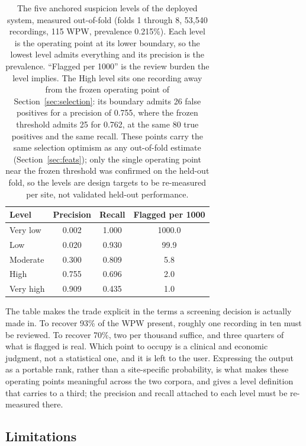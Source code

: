\documentclass[11pt]{article}
\begin{document}
\begin{table}[t]
  \centering
  \small
  \caption{The five anchored suspicion levels of the deployed system, measured out-of-fold (folds 1 through 8, 53{,}540 recordings, 115 WPW, prevalence 0.215\%). Each level is the operating point at its lower boundary, so the lowest level admits everything and its precision is the prevalence. ``Flagged per 1000'' is the review burden the level implies. The High level sits one recording away from the frozen operating point of Section~\ref{sec:selection}: its boundary admits 26 false positives for a precision of 0.755, where the frozen threshold admits 25 for 0.762, at the same 80 true positives and the same recall. These points carry the same selection optimism as any out-of-fold estimate (Section~\ref{sec:feats}); only the single operating point near the frozen threshold was confirmed on the held-out fold, so the levels are design targets to be re-measured per site, not validated held-out performance.}
  \label{tab:anchors}
  \begin{tabular}{@{}lccc@{}}
    \toprule
    Level & Precision & Recall & Flagged per 1000 \\
    \midrule
    Very low   & 0.002 & 1.000 & 1000.0 \\
    Low        & 0.020 & 0.930 & 99.9 \\
    Moderate   & 0.300 & 0.809 & 5.8 \\
    High       & 0.755 & 0.696 & 2.0 \\
    Very high  & 0.909 & 0.435 & 1.0 \\
    \bottomrule
  \end{tabular}
\end{table}

The table makes the trade explicit in the terms a screening decision is actually made in. To recover 93\% of the WPW present, roughly one recording in ten must be reviewed. To recover 70\%, two per thousand suffice, and three quarters of what is flagged is real. Which point to occupy is a clinical and economic judgment, not a statistical one, and it is left to the user. Expressing the output as a portable rank, rather than a site-specific probability, is what makes these operating points meaningful across the two corpora, and gives a level definition that carries to a third; the precision and recall attached to each level must be re-measured there.

\subsection{Limitations}
\label{sec:limits}
\end{document}
